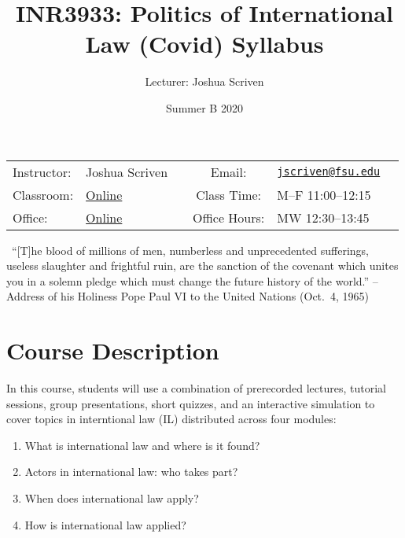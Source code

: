\documentclass[10pt,]{article}
\title{INR3933: Politics of International Law \textbar{} (Covid) Syllabus}
\author{Lecturer: Joshua Scriven}
\date{Summer B 2020}
\providecommand{\tightlist}{%
  \setlength{\itemsep}{0pt}\setlength{\parskip}{0pt}}
\begin{document}
		\maketitle
	

		\thispagestyle{firststyle}

\begin{center}
\begin{tabular}{llccll}
\hline
\rowcolor{Gray}
Instructor: & Joshua Scriven &          \hspace{3cm}           &
Email: & \href{mailto:jscriven@fsu.edu}{\nolinkurl{jscriven@fsu.edu}}\\

Classroom: &  \href{https://fsu.zoom.us/meeting}{Online} & &
Class Time: & M--F 11:00--12:15\\
Office: & \href{https://fsu.zoom.us/meeting}{Online} & &
Office Hours: & MW 12:30--13:45\\
\hline
\end{tabular}

\begin{minipage}{5.2in}
  \begin{flushleft}
    {\color{Gray}{\RectangleBold}} ~{\footnotesize ``{[}T{]}he blood of millions of men, numberless and unprecedented
sufferings, useless slaughter and frightful ruin, are the sanction of
the covenant which unites you in a solemn pledge which must change the
future history of the world.'' --Address of his Holiness Pope Paul VI to the United Nations (Oct.~4,
1965)}\newline
  \end{flushleft}
\end{minipage}


\end{center}

\vspace{2mm}


\hypertarget{course-description}{%
\section{Course Description}\label{course-description}}

In this course, students will use a combination of prerecorded lectures,
tutorial sessions, group presentations, short quizzes, and an
interactive simulation to cover topics in interntional law (IL)
distributed across four modules:

\begin{enumerate}
\def\labelenumi{\arabic{enumi}.}
\tightlist
\item
  What is international law and where is it found?
\item
  Actors in international law: who takes part?
\item
  When does international law apply?
\item
  How is international law applied?
\end{enumerate}
\end{document}
